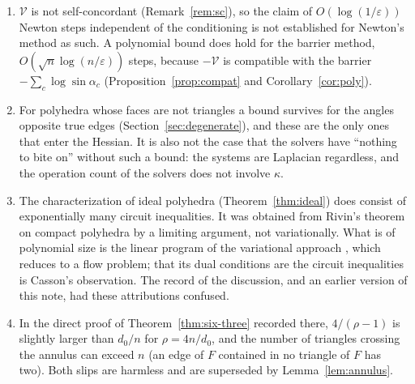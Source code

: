 \documentclass[11pt]{amsart}
\theoremstyle{definition}
\theoremstyle{remark}
\newcommand{\eps}{\varepsilon}
\begin{document}
\begin{enumerate}[leftmargin=*,itemsep=3pt]
\item $\mathcal V$ is not self-concordant (Remark~\ref{rem:sc}), so the claim of $O(\log(1/\eps))$ Newton steps independent of the conditioning is not established for Newton's method as such. A polynomial bound does hold for the barrier method, $O(\sqrt n\log(n/\eps))$ steps, because $-\mathcal V$ is compatible with the barrier $-\sum_c\log\sin\alpha_c$ (Proposition~\ref{prop:compat} and Corollary~\ref{cor:poly}).
\item For polyhedra whose faces are not triangles a bound survives for the angles opposite true edges (Section~\ref{sec:degenerate}), and these are the only ones that enter the Hessian. It is also not the case that the solvers have ``nothing to bite on'' without such a bound: the systems are Laplacian regardless, and the operation count of the solvers does not involve $\kappa$.
\item The characterization of ideal polyhedra (Theorem~\ref{thm:ideal}) does consist of exponentially many circuit inequalities. It was obtained from Rivin's theorem on compact polyhedra \cite{RivTh,HR93} by a limiting argument, not variationally.
What is of polynomial size is the linear program of the variational approach \cite{Riv94}, which \cite{Riv03} reduces to a flow problem; that its dual conditions are the circuit inequalities is Casson's observation. The record of the discussion, and an earlier version of this note, had these attributions confused.
\item In the direct proof of Theorem~\ref{thm:six-three} recorded there, $4/(\rho-1)$ is slightly larger than $d_0/n$ for $\rho=4n/d_0$, and the number of triangles crossing the annulus can exceed $n$ (an edge of $F$ contained in no triangle of $F$ has two). Both slips are harmless and are superseded by Lemma~\ref{lem:annulus}.
\end{enumerate}
\end{document}
